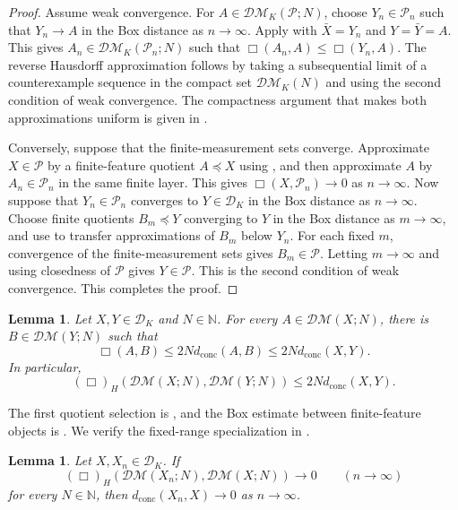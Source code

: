 \documentclass[11pt]{amsart}
\theoremstyle{plain}
\newtheorem{lemma}[theorem]{Lemma}
\theoremstyle{definition}
\theoremstyle{remark}
\newcommand{\DK}{\mathcal D_K}
\newcommand{\DM}{\mathcal{DM}}
\newcommand{\dconc}{d_{\mathrm{conc}}}
\begin{document}
\begin{proof}
Assume weak convergence. For $A\in\DM_K(\mathcal P;N)$, choose $Y_n\in\mathcal P_n$ such that $Y_n\to A$ in the Box distance as $n\to\infty$. Apply  with $\bar X=Y_n$ and $Y=\bar Y=A$. This gives $A_n\in\DM_K(\mathcal P_n;N)$ such that $\Box(A_n,A)\leq\Box(Y_n,A)$. The reverse Hausdorff approximation follows by taking a subsequential limit of a counterexample sequence in the compact set $\DM_K(N)$ and using the second condition of weak convergence. The compactness argument that makes both approximations uniform is given in .

Conversely, suppose that the finite-measurement sets converge. Approximate $X\in\mathcal P$ by a finite-feature quotient $A\preceq X$ using , and then approximate $A$ by $A_n\in\mathcal P_n$ in the same finite layer. This gives $\Box(X,\mathcal P_n)\to0$ as $n\to\infty$. Now suppose that $Y_n\in\mathcal P_n$ converges to $Y\in\DK$ in the Box distance as $n\to\infty$. Choose finite quotients $B_m\preceq Y$ converging to $Y$ in the Box distance as $m\to\infty$, and use  to transfer approximations of $B_m$ below $Y_n$. For each fixed $m$, convergence of the finite-measurement sets gives $B_m\in\mathcal P$. Letting $m\to\infty$ and using closedness of $\mathcal P$ gives $Y\in\mathcal P$. This is the second condition of weak convergence. This completes the proof.
\end{proof}

\begin{lemma}
\label{lem:finite-measurement-proximity}
Let $X,Y\in\DK$ and $N\in\mathbb N$. For every $A\in\DM(X;N)$, there is $B\in\DM(Y;N)$ such that
\[
\Box(A,B)\leq2N\dconc(A,B)\leq2N\dconc(X,Y).
\]
In particular,
\[
(\Box)_H(\DM(X;N),\DM(Y;N))\leq2N\dconc(X,Y).
\]
\end{lemma}

The first quotient selection is \cite[Lemma~6.10]{gds2}, and the Box estimate between finite-feature objects is \cite[Proposition~6.8]{gds2}. We verify the fixed-range specialization in .

\begin{lemma}
\label{lem:finite-measurement-reconstruction}
Let $X,X_n\in\DK$. If
\[
(\Box)_H(\DM(X_n;N),\DM(X;N))\longrightarrow0\qquad(n\to\infty)
\]
for every $N\in\mathbb N$, then $\dconc(X_n,X)\to0$ as $n\to\infty$.
\end{lemma}
\end{document}
